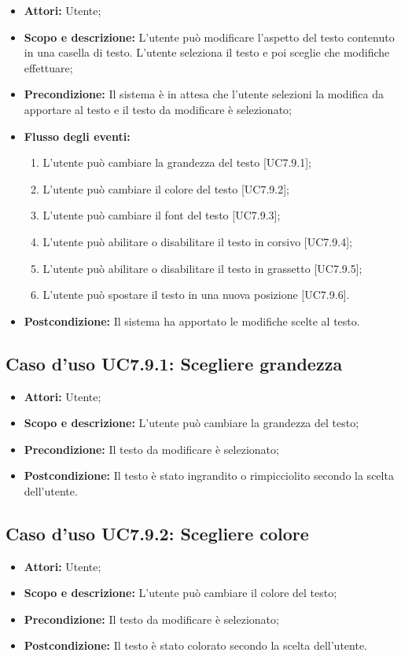 \begin{itemize}
	\item \textbf{Attori:} Utente;
	\item \textbf{Scopo e descrizione:} L'utente può modificare l'aspetto del testo contenuto in una casella di testo. L'utente seleziona il testo e poi sceglie che modifiche effettuare;
	\item \textbf{Precondizione:} Il sistema è in attesa che l'utente selezioni la modifica da apportare al testo e il testo da modificare è selezionato;
	\item \textbf{Flusso degli eventi:}
	\begin{enumerate}
		\item L'utente può cambiare la grandezza del testo [UC7.9.1];
		\item L'utente può cambiare il colore del testo [UC7.9.2];
		\item L'utente può cambiare il \gls{font} del testo [UC7.9.3];
		\item L'utente può abilitare o disabilitare il testo in corsivo [UC7.9.4];
		\item L'utente può abilitare o disabilitare il testo in grassetto [UC7.9.5];
		\item L'utente può spostare il testo in una nuova posizione [UC7.9.6].
	\end{enumerate}
	\item \textbf{Postcondizione:} Il sistema ha apportato le modifiche scelte al testo.
\end{itemize}

\subsection{Caso d'uso UC7.9.1: Scegliere grandezza}
\begin{itemize}
	\item \textbf{Attori:} Utente;
	\item \textbf{Scopo e descrizione:} L'utente può cambiare la grandezza del testo;
	\item \textbf{Precondizione:} Il testo da modificare è selezionato;
	\item \textbf{Postcondizione:} Il testo è stato ingrandito o rimpicciolito secondo la scelta dell'utente.
\end{itemize}

\subsection{Caso d'uso UC7.9.2: Scegliere colore}
\begin{itemize}
	\item \textbf{Attori:} Utente;
	\item \textbf{Scopo e descrizione:} L'utente può cambiare il colore del testo;
	\item \textbf{Precondizione:} Il testo da modificare è selezionato;
	\item \textbf{Postcondizione:} Il testo è stato colorato secondo la scelta dell'utente.
\end{itemize}

